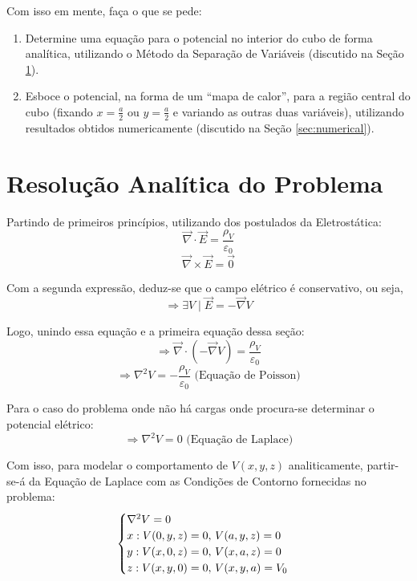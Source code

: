 \documentclass{report}
\let\oldsection\section
\renewcommand\section{\clearpage\oldsection}
\begin{document}
Com isso em mente, faça o que se pede:
\begin{enumerate}
    \item Determine uma equação para o potencial no interior do cubo de forma analítica, utilizando o Método da Separação de Variáveis
    (discutido na Seção \ref{sec:analysis}).
    \item Esboce o potencial, na forma de um ``mapa de calor”, para a região central do cubo (fixando $ x = \frac{a}{2} $
    ou $ y = \frac{a}{2} $ e variando as outras duas variáveis), utilizando resultados obtidos numericamente (discutido na Seção
    \ref{sec:numerical}).
\end{enumerate}

\section{Resolução Analítica do Problema}
\label{sec:analysis}

Partindo de primeiros princípios, utilizando dos postulados da Eletrostática:
$$ \overrightarrow{\nabla}\cdot \overrightarrow{E} = \frac{\rho_V}{\varepsilon_0} $$
$$ \overrightarrow{\nabla}\times \overrightarrow{E} = \overrightarrow{0} $$

Com a segunda expressão, deduz-se que o campo elétrico é conservativo, ou seja,
$$ \Rightarrow \exists V \mid \overrightarrow{E} = -\overrightarrow{\nabla} V $$

Logo, unindo essa equação e a primeira equação dessa seção:
$$ \Rightarrow \overrightarrow{\nabla}\cdot(-\overrightarrow{\nabla} V) = \frac{\rho_V}{\varepsilon_0} $$
$$ \Rightarrow \nabla^2V = -\frac{\rho_V}{\varepsilon_0} \text{ (Equação de Poisson)} $$

Para o caso do problema onde não há cargas onde procura-se determinar o potencial elétrico:
$$ \Rightarrow \nabla^2V = 0 \text{ (Equação de Laplace)} $$

Com isso, para modelar o comportamento de $ V(x, y, z) $ analiticamente, partir-se-á da Equação
de Laplace com as Condições de Contorno fornecidas no problema:
\begin{equation}
  \label{eq:laplace}
  \centering
  \begin{cases}
    \nabla^2 V = 0 \\
    x: V(0, y, z) = 0,\, V(a, y, z) = 0 \\
    y: V(x, 0, z) = 0,\, V(x, a, z) = 0 \\
    z: V(x, y, 0) = 0,\, V(x, y, a) = V_0
  \end{cases}
\end{equation}
\end{document}
